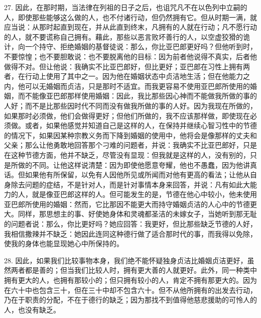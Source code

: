 27. 因此，在那时期，当法律在列祖的日子之后，也诅咒凡不在以色列中立嗣的人，即使那些能够这么做的人，也不付诸行动，但仍然拥有它。但从时期一满，就应当说：从那时起直到现在，并从此直到终末，凡拥有的人就在行动；凡不愿行动的人，就不要谎称自己拥有。藉此，那些以恶言败坏善行的人，以空虚狡猾的诡计，向一个持守、拒绝婚姻的基督徒说：那么，你比亚巴郎更好吗？但他听到时，不要惊惶；也不要胆敢说：也不要脱离他的目标：因为前者他说得不真实，后者他做得不对。但让他说：我确实不比亚巴郎好，但比更好；亚巴郎在习性上拥有两者，在行动上使用了其中之一。因为他在婚姻状态中贞洁地生活；但在他能力之内，他可以无婚姻而贞洁，只是那时不适宜。而我更容易不使用亚巴郎所使用的婚姻，而不能像亚巴郎那样使用婚姻：因此，我比那些因心神而不能做我所做的事的人好；而不是比那些因时代不同而没有做我所做的事的人好。因为我现在所做的，如果那时必须做，他们会做得更好；但他们所做的，我不应该那样做，即使现在必须做。或者，如果他感觉并知道自己是这样的人，在保持并继续心智习性中的节德的情况下，如果因某种宗教义务而下降到婚姻的使用中，他将会是像那样的丈夫和父亲；那么让他勇敢地回答那个刁难的问题者，并说：我确实不比亚巴郎好，只是在这种节德方面，他并不缺乏，尽管没有显现：但我就是这样的人，没有别的，只是所做的不同。让他这样说清楚：因为即使他愿意夸耀，他也不愚蠢，因为他讲真话。但如果他有所保留，以免有人因他所见或所闻而对他有更高的看法；让他从自身除去问题的症结，不是针对人，而是针对事情本身来回答，并说：凡有如此大能力的人，就是像亚巴郎这样的人。但可能发生的是，节德在他心中较小，他未使用亚巴郎所使用的婚姻：然而，它比那因不能更大而持守婚姻贞洁的人心中的节德更大。同样，那思想主的事、好使她身体和灵魂都圣洁的未嫁女子，当她听到那无耻的问题者说：那么，你比更好吗？她应回答：我更好，但比那些缺乏节德的人好，我相信撒辣并不缺乏：她因此连同这种德行做了适合那时代的事，而我得以免除，使我的身体也能显现她心中所保持的。\par

28. 因此，如果我们比较事物本身，我们绝不能怀疑独身贞洁比婚姻贞洁更好，虽然两者都是善的；但当我们比较人时，拥有更大善的人就更好。此外，同一种类中拥有更大的人，也拥有那较小的；但只拥有较小的人，肯定不拥有那更大的。因为在六十中也包含三十，但在三十中却不包含六十。但不从他所拥有的出发去行动，乃在于职责的分配，不在于德行的缺乏；因为那找不到值得他慈悲援助的可怜人的人，也没有缺乏。\par


